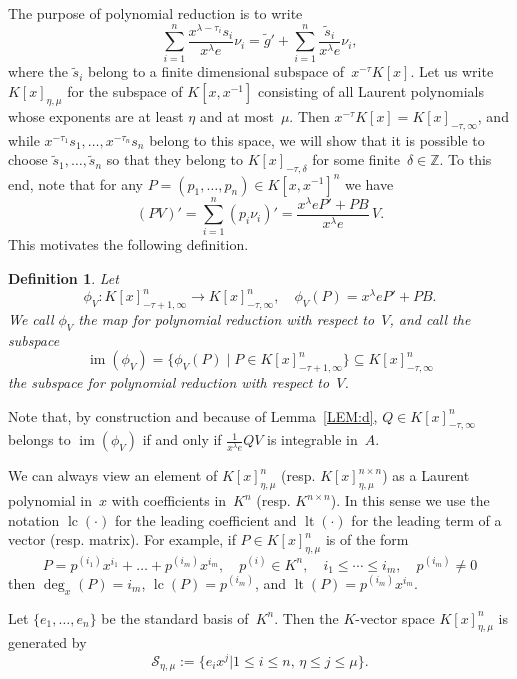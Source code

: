 \documentclass[final,1p,times,authoryear]{elsarticle}
\newtheorem{defi}[theorem]{Definition}
\newcommand{\cS}{ {\mathcal S}}
\let\set\mathbb
\def\lc{\operatorname{lc}}
\def\lt{\operatorname{lt}}
\def\im{\operatorname{im}}
\begin{document}
The purpose of polynomial reduction is to write
\[
  \sum_{i=1}^n\frac{x^{\lambda-\tau_i}s_i}{x^{\lambda}e}\nu_i=\tilde g'+
  \sum_{i=1}^n\frac{\tilde s_i}{x^\lambda e}\nu_i,
\]
where the $\tilde s_i$ belong to a finite dimensional subspace of~$x^{-\tau}K[x]$.
Let us write $K[x]_{\eta,\mu}$ for the subspace of $K[x,x^{-1}]$ consisting of all Laurent polynomials
whose exponents are at least $\eta$ and at most~$\mu$. Then $x^{-\tau}K[x]=K[x]_{-\tau,\infty}$, and
while $x^{-\tau_1}s_1,\dots,x^{-\tau_n}s_n$ belong to this space, we will show that it is possible to
choose $\tilde s_1,\dots,\tilde s_n$ so that they belong to $K[x]_{-\tau,\delta}$ for some finite~$\delta\in\set Z$.
To this end, note that for any $P = (p_1, \ldots, p_n)\in K[x,x^{-1}]^n$ we have
\begin{equation} \label{EQ:polyred}
  (PV)' = \sum_{i=1}^n (p_i \nu_i)' = \frac{x^\lambda eP' + PB}{x^\lambda e}\,V.
\end{equation}
This motivates the following definition.

\begin{defi}
  Let 
  \[
    \phi_V\colon K[x]_{-\tau+1,\infty}^n \to K[x]_{-\tau,\infty}^n,\quad
    \phi_V(P) = x^\lambda eP' + PB.
  \]
  We call $\phi_V$ the \emph{map for polynomial reduction} with respect to~$V$, and call
  the subspace
\[
 \im(\phi_V) = \{\phi_V(P) \mid P \in K[x]_{-\tau+1,\infty}^n\}\subseteq K[x]_{-\tau,\infty}^n
\]
the \emph{subspace for polynomial reduction} with respect to~$V$.
\end{defi}

Note that, by construction and because of Lemma~\ref{LEM:d}, $Q\in K[x]_{-\tau,\infty}^n$ belongs to
$\im(\phi_V)$ if and only if $\frac{1}{x^\lambda e}QV$ is integrable in~$A$. 

We can always view an element of $K[x]_{\eta,\mu}^n$ (resp. $K[x]_{\eta,\mu}^{n\times n}$) as a Laurent polynomial in~$x$
with coefficients in~$K^n$ (resp. $K^{n\times n}$). In this sense we use the notation $\lc(\cdot)$
for the leading coefficient and $\lt(\cdot)$ for the leading term of a vector (resp. matrix).
For example, if $P\in K[x]_{\eta,\mu}^n$ is of the form
\[
  P = p^{(i_1)}x^{i_1} + \dots + p^{(i_m)}x^{i_m},\quad p^{(i)}\in K^n,\quad i_1\leq\cdots\leq i_m,\quad p^{(i_m)}\neq0
\]
then $\deg_x(P)=i_m$, $\lc(P)=p^{(i_m)}$, and $\lt(P)=p^{(i_m)}x^{i_m}$.

Let $\{e_1, \ldots, e_n\}$ be the standard basis of~$K^n$.
Then the $K$-vector space $K[x]_{\eta,\mu}^n$ is generated by
\[
  \cS_{\eta,\mu}:= \bigl\{e_ix^j \mathrel{\big|} 1\leq i \leq n,\, \eta\leq j\leq \mu\bigr\}.
\]
\end{document}
